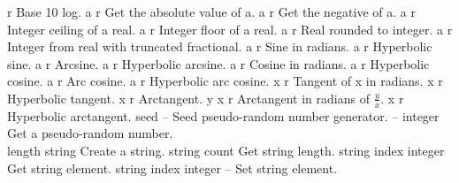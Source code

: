 \begin{longtable}{}
	{r}
	{Base 10 log.}
\hline
\optableent
	{a}
	{{\bf {}}}
	{r}
	{Get the absolute value of a.}
\hline
\optableent
	{a}
	{{\bf {}}}
	{r}
	{Get the negative of a.}
\hline
\optableent
	{a}
	{{\bf {}}}
	{r}
	{Integer ceiling of a real.}
\hline
\optableent
	{a}
	{{\bf {}}}
	{r}
	{Integer floor of a real.}
\hline
\optableent
	{a}
	{{\bf {}}}
	{r}
	{Real rounded to integer.}
\hline
\optableent
	{a}
	{{\bf {}}}
	{r}
	{Integer from real with truncated fractional.}
\hline
\optableent
	{a}
	{{\bf {}}}
	{r}
	{Sine in radians.}
\hline
\optableent
	{a}
	{{\bf {}}}
	{r}
	{Hyperbolic sine.}
\hline
\optableent
	{a}
	{{\bf {}}}
	{r}
	{Arcsine.}
\hline
\optableent
	{a}
	{{\bf {}}}
	{r}
	{Hyperbolic arcsine.}
\hline
\optableent
	{a}
	{{\bf {}}}
	{r}
	{Cosine in radians.}
\hline
\optableent
	{a}
	{{\bf {}}}
	{r}
	{Hyperbolic cosine.}
\hline
\optableent
	{a}
	{{\bf {}}}
	{r}
	{Arc cosine.}
\hline
\optableent
	{a}
	{{\bf {}}}
	{r}
	{Hyperbolic arc cosine.}
\hline
\optableent
	{x}
	{{\bf {}}}
	{r}
	{Tangent of x in radians.}
\hline
\optableent
	{x}
	{{\bf {}}}
	{r}
	{Hyperbolic tangent.}
\hline
\optableent
	{x}
	{{\bf {}}}
	{r}
	{Arctangent.}
\hline
\optableent
	{y x}
	{{\bf {}}}
	{r}
	{Arctangent in radians of $\frac{y}{x}$.}
\hline
\optableent
	{x}
	{{\bf {}}}
	{r}
	{Hyperbolic arctangent.}
\hline
\optableent
	{seed}
	{{\bf {}}}
	{--}
	{Seed pseudo-random number generator.}
\hline
\optableent
	{--}
	{{\bf {}}}
	{integer}
	{Get a pseudo-random number.}
\hline \hline
{} \\
\hline \hline
\optableent
	{length}
	{{\bf {}}}
	{string}
	{Create a string.}
\hline
\optableent
	{string}
	{{\bf {}}}
	{count}
	{Get string length.}
\hline
\optableent
	{string index}
	{{\bf {}}}
	{integer}
	{Get string element.}
\hline
\optableent
	{string index integer}
	{{\bf {}}}
	{--}
	{Set string element.}

\end{longtable}
